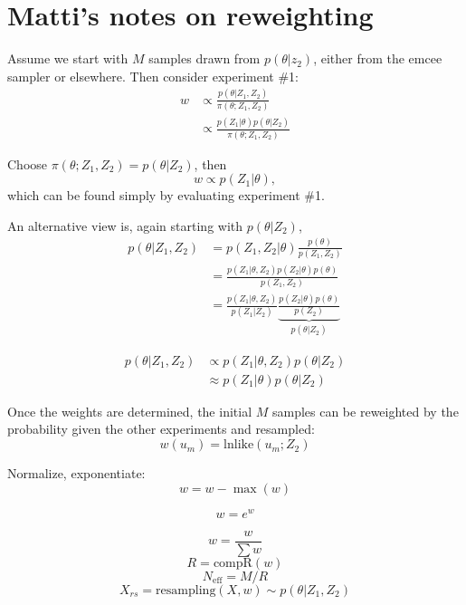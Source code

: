 \documentclass{tufte-handout}
\begin{document}
\section{Matti's notes on reweighting}
Assume we start with $M$ samples drawn from $p(\theta|z_2)$, either
from the emcee sampler or elsewhere. Then consider experiment \#1:
\begin{align}
  \label{eq:1}
  w & \propto \frac{ p(\theta|Z_1,Z_2) }{\pi(\theta; Z_1, Z_2)}\\
  & \propto \frac{ p(Z_1|\theta) p (\theta|Z_2)}{\pi(\theta; Z_1, Z_2)}
\end{align}

Choose $\pi(\theta; Z_1, Z_2) = p(\theta|Z_2)$, then
\begin{equation*}
  w \propto p(Z_1 | \theta),
\end{equation*}
which can be found simply by evaluating experiment \#1. 

An alternative view is, again starting with $p(\theta|Z_2)$,
\begin{align*}
  p(\theta|Z_1,Z_2) &= p (Z_1, Z_2 | \theta) \frac{
    p(\theta)}{p(Z_1,Z_2)} \\
& = \frac{p(Z_1|\theta, Z_2) p(Z_2|\theta) p(\theta)}{ p(Z_1,Z_2)}\\
 & = \frac{p(Z_1|\theta, Z_2)}{p(Z_1|Z_2)} \underbrace{\frac{p(Z_2|\theta)p(\theta)}{p(Z_2)}}_{p(\theta|Z_2)}
\end{align*}

\begin{align*}
  p(\theta|Z_1,Z_2)& \propto p(Z_1|\theta, Z_2) p(\theta|Z_2) \\
  & \approx p(Z_1|\theta) p(\theta|Z_2)
\end{align*}

Once the weights are determined, the initial $M$ samples can be
reweighted by the probability given the other experiments and resampled:
\begin{equation*}
  w(u_m) = \mathrm{lnlike}(u_m; Z_2)
\end{equation*}

Normalize, exponentiate:
\begin{equation*}
  w = w - \max(w)
\end{equation*}

\begin{equation*}
  w = e^w
\end{equation*}

\begin{equation*}
  w = \frac{w}{\sum w}
\end{equation*}
\begin{equation*}
  R = \mathrm{compR}(w)
\end{equation*}
\begin{equation*}
  N_{\mathrm{eff}} = M/R
\end{equation*}
\begin{equation*}
  X_{rs} = \mathrm{resampling}(X,w) \sim p(\theta|Z_1,Z_2)
\end{equation*}
\end{document}
